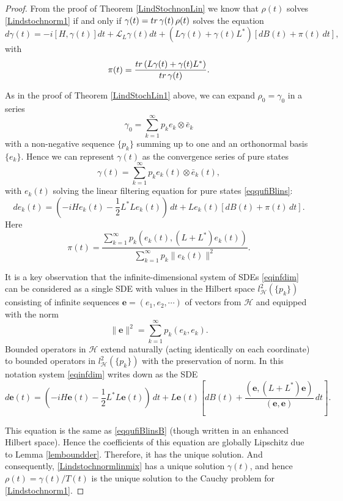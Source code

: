 \documentclass[10pt,a4paper]{amsart}
\def\LC{\mathcal{L}}
\def\HC{\mathcal{H}}
\def\e{\mathbf{e}}
\def\tr{\rm{tr}}
\def\ga{\gamma}
\begin{document}
\begin{proof}
From the proof of Theorem \ref{LindStochnonLin} we know that $\rho(t)$ solves \eqref{Lindstochnorm1}
 if and only if $\ga(t)={\tr}\, \ga(t)\, \rho(t)$ solves the equation
  \begin{equation}
\label{Lindstochnormlinmix}
d\ga(t)=-i[H, \ga(t)] dt +\LC_L \ga(t) dt +(L\ga(t)+\ga(t) L^*)
[dB(t)+ \pi(t) \, dt],
\end{equation}
with
\[
\pi(t)=\frac{{\tr} \, (L\ga(t)+\ga(t) L^*)}{{\tr}\, \ga(t)}.
\]

As in the proof of Theorem \ref{LindStochLin1} above, we can
expand $\rho_0=\ga_0$ in a series
\[
 \ga_0=\sum_{k=1}^{\infty} p_k e_k\otimes \bar e_k
 \]
 with a non-negative sequence $\{p_k\}$ summing up to one
 and an orthonormal basis $\{e_k\}$.
Hence we can represent $\ga(t)$ as the convergence series of pure states
 \[
 \ga(t)=\sum_{k=1}^{\infty} p_k e_k(t)\otimes \bar e_k(t),
 \]
 with $e_k(t)$ solving the linear filtering equation for
pure states \eqref{eqqufiBlins}:
\begin{equation}
\label{eqinfdim}
de_k(t)=(-iH e_k(t)-\frac12 L^*L e_k(t))\,dt +Le_k(t) [dB(t)+\pi(t)\, dt].
\end{equation}
Here
\[
\pi(t)=\frac{\sum_{k=1}^{\infty} p_k (e_k(t), (L+L^*) e_k(t))}{\sum_{k=1}^{\infty} p_k \|e_k(t)\|^2}.
\]

It is a key observation that the infinite-dimensional system of SDEs \eqref{eqinfdim}
can be considered as a single SDE
with values in the  Hilbert space $l^2_{\HC}(\{p_k\})$ consisting of infinite sequences
$\e=(e_1, e_2, \cdots )$ of vectors from $\HC$ and equipped
with the norm
\[
\|\e\|^2=\sum_{k=1}^{\infty} p_k (e_k, e_k).
\]
Bounded operators in $\HC$ extend naturally (acting identically on each coordinate)
to bounded operators in $l^2_{\HC}(\{p_k\})$ with the preservation of norm.
In this notation system \eqref{eqinfdim} writes down as the SDE
\begin{equation}
\label{eqinfdim1}
d \e(t)=(-iH \e(t)-\frac12 L^*L \e(t))\, dt +L\e(t) \left[dB(t)+\frac{(\e, (L+L^*) \e)}{(\e, \e)} \, dt\right].
\end{equation}

This equation is the same as \eqref{eqqufiBlinsB} (though written in an enhanced Hilbert space). Hence
the coefficients of this equation are globally Lipschitz due to Lemma \ref{lemboundder}.
Therefore, it has the unique solution. And consequently, \eqref{Lindstochnormlinmix} has a unique solution $\ga(t)$,
and hence  $\rho(t)=\ga(t)/T(t)$ is the unique solution to the Cauchy problem for \eqref{Lindstochnorm1}.
\end{proof}
\end{document}

